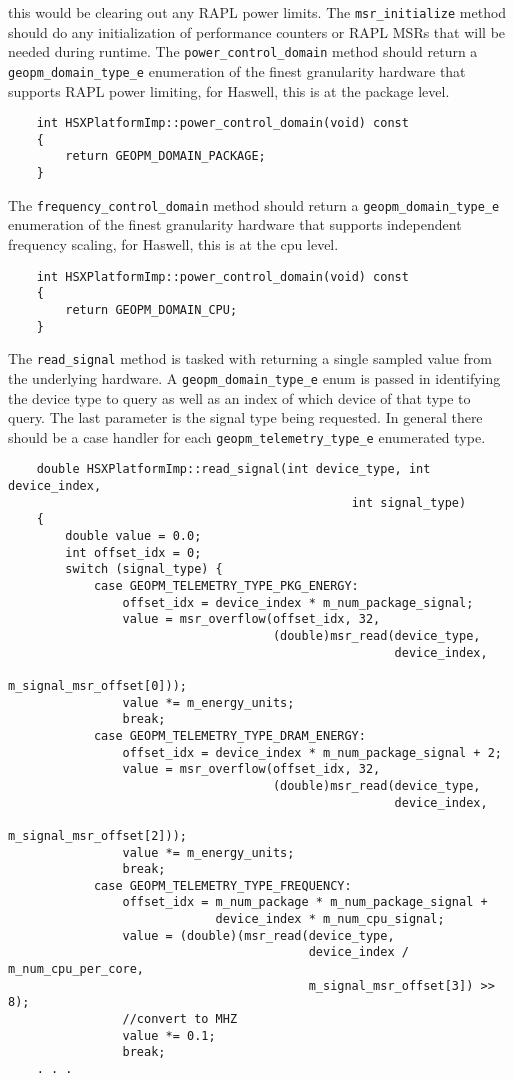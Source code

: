 \documentclass[11pt]{article}
\begin{document}
this would be clearing out any RAPL power limits.  The
\verb#msr_initialize# method should do any initialization of
performance counters or RAPL MSRs that will be needed during runtime.
The \verb#power_control_domain# method should return a
\verb#geopm_domain_type_e# enumeration of the finest granularity
hardware that supports RAPL power limiting, for Haswell, this is at
the package level.
\begin{verbatim}
    int HSXPlatformImp::power_control_domain(void) const
    {
        return GEOPM_DOMAIN_PACKAGE;
    }
\end{verbatim}
The \verb#frequency_control_domain# method should return a
\verb#geopm_domain_type_e# enumeration of the finest granularity
hardware that supports independent frequency scaling, for Haswell,
this is at the cpu level.
\begin{verbatim}
    int HSXPlatformImp::power_control_domain(void) const
    {
        return GEOPM_DOMAIN_CPU;
    }
\end{verbatim}
The \verb#read_signal# method is tasked with returning a single
sampled value from the underlying hardware. A
\verb#geopm_domain_type_e# enum is passed in identifying the device
type to query as well as an index of which device of that type to
query. The last parameter is the signal type being requested. In
general there should be a case handler for each
\verb#geopm_telemetry_type_e# enumerated type.
\begin{verbatim}
    double HSXPlatformImp::read_signal(int device_type, int device_index,
                                                int signal_type)
    {
        double value = 0.0;
        int offset_idx = 0;
        switch (signal_type) {
            case GEOPM_TELEMETRY_TYPE_PKG_ENERGY:
                offset_idx = device_index * m_num_package_signal;
                value = msr_overflow(offset_idx, 32,
                                     (double)msr_read(device_type,
                                                      device_index,
                                                      m_signal_msr_offset[0]));
                value *= m_energy_units;
                break;
            case GEOPM_TELEMETRY_TYPE_DRAM_ENERGY:
                offset_idx = device_index * m_num_package_signal + 2;
                value = msr_overflow(offset_idx, 32,
                                     (double)msr_read(device_type,
                                                      device_index,
                                                      m_signal_msr_offset[2]));
                value *= m_energy_units;
                break;
            case GEOPM_TELEMETRY_TYPE_FREQUENCY:
                offset_idx = m_num_package * m_num_package_signal +
                             device_index * m_num_cpu_signal;
                value = (double)(msr_read(device_type,
                                          device_index / m_num_cpu_per_core,
                                          m_signal_msr_offset[3]) >> 8);
                //convert to MHZ
                value *= 0.1;
                break;
    . . .
\end{verbatim}
\end{document}

